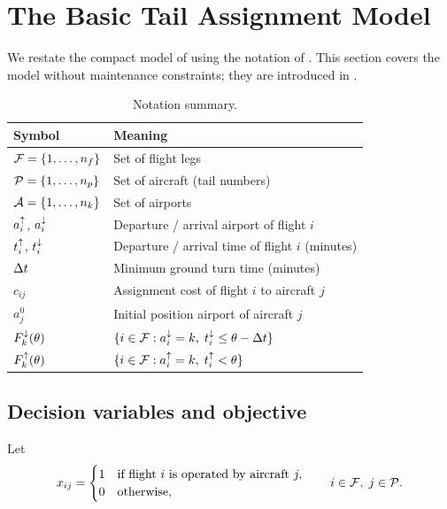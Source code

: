 \section{The Basic Tail Assignment Model}
\label{sec:basic}

We restate the compact model of \citet{khaled2018compact} using the notation
of .  This section covers the model without maintenance
constraints; they are introduced in .

\begin{table}[t]
\centering\small
\caption{Notation summary.}
\label{tab:notation}
\begin{tabular}{ll}
\toprule
Symbol & Meaning \\
\midrule
$\mathcal{F} = \{1,\ldots,n_f\}$     & Set of flight legs \\
$\mathcal{P} = \{1,\ldots,n_p\}$    & Set of aircraft (tail numbers) \\
$\mathcal{A} = \{1,\ldots,n_k\}$     & Set of airports \\
$a^{\uparrow}_{i}$, $a^{\downarrow}_{i}$          & Departure / arrival airport of flight $i$ \\
$t^{\uparrow}_{i}$, $t^{\downarrow}_{i}$          & Departure / arrival time of flight $i$ (minutes) \\
$\Delta t$                        & Minimum ground turn time (minutes) \\
$c_{ij}$                     & Assignment cost of flight $i$ to aircraft $j$ \\
$a^0_j$                      & Initial position airport of aircraft $j$ \\
$F^{\downarrow}_{k}(\theta)$             & $\{i \in \mathcal{F} : a^{\downarrow}_{i} = k,\; t^{\downarrow}_{i} \le \theta - \Delta t\}$ \\
$F^{\uparrow}_{k}(\theta)$             & $\{i \in \mathcal{F} : a^{\uparrow}_{i} = k,\; t^{\uparrow}_{i} < \theta\}$ \\
\bottomrule
\end{tabular}
\end{table}

\subsection{Decision variables and objective}

Let
\begin{equation}
  x_{ij} = \begin{cases} 1 & \text{if flight } i \text{ is operated by aircraft } j, \\ 0 & \text{otherwise,} \end{cases}
  \qquad i \in \mathcal{F},\; j \in \mathcal{P}.
\end{equation}

